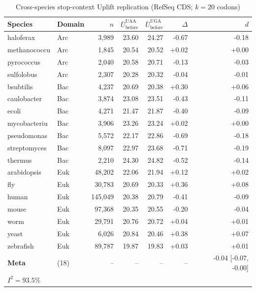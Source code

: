 
\begin{table}[htbp]
\centering
\caption{Cross-species stop-context Uplift replication (RefSeq CDS; $k=20$ codons)}
\label{tab:cross_species_stop_context}
\begin{tabular}{llrrrrr}
\toprule
Species & Domain & $n$ & $\bar{U}_{\mathrm{before}}^{\mathrm{UAA}}$ & $\bar{U}_{\mathrm{before}}^{\mathrm{UGA}}$ & $\Delta$ & $d$ \\
\midrule
haloferax & Arc & 3,989 & 23.60 & 24.27 & -0.67 & -0.18 \\
methanococcu & Arc & 1,845 & 20.54 & 20.52 & +0.02 & +0.00 \\
pyrococcus & Arc & 2,040 & 20.58 & 20.71 & -0.13 & -0.03 \\
sulfolobus & Arc & 2,307 & 20.28 & 20.32 & -0.04 & -0.01 \\
bsubtilis & Bac & 4,237 & 20.69 & 20.38 & +0.30 & +0.06 \\
caulobacter & Bac & 3,874 & 23.08 & 23.51 & -0.43 & -0.11 \\
ecoli & Bac & 4,271 & 21.47 & 21.87 & -0.40 & -0.09 \\
mycobacteriu & Bac & 3,906 & 23.26 & 23.24 & +0.02 & +0.00 \\
pseudomonas & Bac & 5,572 & 22.17 & 22.86 & -0.69 & -0.18 \\
streptomyces & Bac & 8,097 & 22.97 & 23.68 & -0.71 & -0.19 \\
thermus & Bac & 2,210 & 24.30 & 24.82 & -0.52 & -0.14 \\
arabidopsis & Euk & 48,202 & 22.06 & 21.94 & +0.12 & +0.02 \\
fly & Euk & 30,783 & 20.69 & 20.33 & +0.36 & +0.08 \\
human & Euk & 145,049 & 20.38 & 20.79 & -0.41 & -0.09 \\
mouse & Euk & 97,368 & 20.35 & 20.55 & -0.20 & -0.04 \\
worm & Euk & 29,791 & 20.76 & 20.72 & +0.04 & +0.01 \\
yeast & Euk & 6,026 & 20.84 & 20.46 & +0.38 & +0.07 \\
zebrafish & Euk & 89,787 & 19.87 & 19.83 & +0.03 & +0.01 \\
\midrule
\textbf{Meta} & (18) & -- & -- & -- & -- & -0.04 [-0.07, -0.00] \\
\multicolumn{7}{l}{$I^2 = 93.5\%$} \\
\bottomrule
\end{tabular}
\end{table}